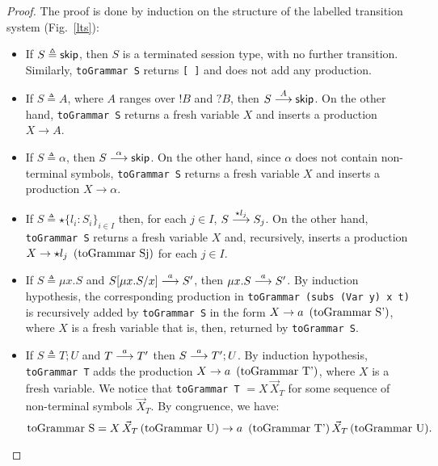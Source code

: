 \begin{proof}
The proof is done by induction on the structure of the labelled 
transition system (Fig.~\ref{lts}):
\begin{itemize}
	\item If $S\triangleq \skipk$, then $S$ is a terminated 
	      session type, with no further transition. Similarly, 
	      \lstinline{toGrammar S} returns \lstinline{[ ]} and 
	      does not add any production.
	\item If $S\triangleq A$, where $A$ ranges over $!B$ and $?B$, 
	      then $S  \LTSderives[A] \skipk$. On the other hand, 
	      \lstinline{toGrammar S} returns a fresh variable $X$ and 
	      inserts a production $X\rightarrow A$. 
	\item If $S \triangleq \alpha$, then $S   \LTSderives[\alpha] \skipk$. 
	      On the other hand, since $\alpha$ does not contain non-terminal 
	      symbols, \lstinline{toGrammar S} returns a fresh variable $X$ and 
	      inserts a production $X\rightarrow \alpha$.
	\item If $S\triangleq \star\{l_i\colon S_i\}_{i\in I}$ then, for each 
          $j\in I$, $S \LTSderives[\star l_j] S_j$. On the other hand, 
          \lstinline{toGrammar S} returns a fresh variable 
          $X$ and, recursively, inserts a production 
          $X\rightarrow \star l_j \enspace \text{(\lstinline{toGrammar Sj})}$
          for each $j\in I$.
	\item If $S\triangleq \mu x.S$ and $S[\mu x.S/x] \LTSderives[a] S'$, 
	      then $\mu x.S \LTSderives[a] S'$. By induction hypothesis,
	      the corresponding production in \lstinline{toGrammar (subs (Var y) x t)} 
	      is recursively added by \lstinline{toGrammar S} in the form
	      $X \rightarrow a\enspace  \text{(\lstinline{toGrammar S'})}$,
	      where $X$ is a fresh variable that is, then, returned by 
	      \lstinline{toGrammar S}.
	\item If $S\triangleq T;U$ and $T \LTSderives[a] T'$ then $S \LTSderives[a] T';U$. 
	      By induction hypothesis, \lstinline{toGrammar T} adds the production 
	      $X\rightarrow a \enspace \text{(\lstinline{toGrammar T'})}$, where 
	      $X$ is a fresh variable.
		  We notice that \lstinline{toGrammar T} $= X \, \vec X_T$ for some 
		  sequence of non-terminal symbols $\vec X_T$. By congruence, we have: 
		  \[\text{\lstinline{toGrammar S}} = X \, \vec X_T \, \text{(\lstinline{toGrammar U})} 
		  \rightarrow a \enspace \text{(\lstinline{toGrammar T'})} \, \vec X_T  \, 
		  \text{(\lstinline{toGrammar U})} .\]

\end{itemize}
\end{proof}
